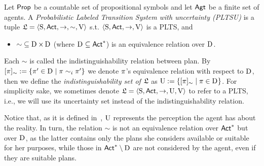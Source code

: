 \begin{definition}\label{def:plts}
    Let ${\rm \sf Prop}$ be a countable set of propositional symbols and let ${\rm \sf Agt}$ be a finite set of agents.  
    A \emph{Probabilistic Labeled Transition System with uncertainty (PLTSU)}  is a tuple
    $\mathfrak{L}=\langle{\operatorname{S},{\rm \sf Act},\rightarrow,\sim,\operatorname{V}}\rangle$ s.t. $\langle{\operatorname{S},{\rm \sf Act},\rightarrow,\operatorname{V}}\rangle$ is a PLTS, and 
    \begin{itemize}
        \item ${\sim}\subseteq \operatorname{D}_{}\times \operatorname{D}_{}$ (where $\operatorname{D}_{}\subseteq{\rm \sf Act}^*$) is an equivalence relation over $\operatorname{D}_{}$. 
    \end{itemize}
    Each $\sim$ is called the indistinguishability relation between plan. 
    By $[\pi]_{\sim}:=\{{\pi' \in \operatorname{D}_{} \mid \pi \sim_i \pi'}\}$ we denote $\pi$'s equivalence relation with respect to $\operatorname{D}_{}$, then we define the \emph{indistinguishability set of $\mathfrak{L}$} as $\operatorname{U} := \{{[\pi]_{\sim} \mid \pi\in\operatorname{D}_{}}\}$. 
    For simplicity sake, we sometimes denote $\mathfrak{L}=\langle{\operatorname{S},{\rm \sf Act},\rightarrow,\operatorname{U},\operatorname{V}}\rangle$ to refer to a PLTS, i.e., we will use its uncertainty set instead of the indistinguishability relation.
\end{definition}

Notice that, as it is defined in~\cite{AFSVQ21,AFSVQ23}, $\operatorname{U}$ represents the perception the agent has about the reality. In turn, the relation $\sim$ is not an equivalence relation over ${\rm \sf Act}^*$ but over $\operatorname{D}_{}$, as the latter contains only the plans she considers available or suitable for her purposes, while those in ${\rm \sf Act}^*\setminus\operatorname{D}_{}$ are not considered by the agent, even if they are suitable plans. 


